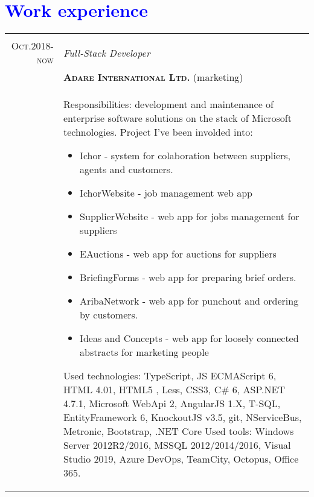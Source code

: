 \documentclass[a4paper,12pt]{article}
\begin{document}
\vspace{3em}
\section{\textcolor{Blue}{Work experience}}
\begin{tabular}{r|p{12cm}}
	\multicolumn{2}{c}{}\\
	\textsc{Oct.2018-now}
	&\emph{Full-Stack Developer} \\
	&\textsc{\textbf{Adare International Ltd.}} (marketing) \\
	&\footnotesize{
		Responsibilities: development and maintenance of enterprise software solutions on the stack of Microsoft technologies. \newline
		Project I've been involded into:
		\begin{itemize}
			\item Ichor - system for colaboration between suppliers, agents and customers.
			\item IchorWebsite - job management web app
			\item SupplierWebsite - web app for jobs management for suppliers
			\item EAuctions - web app for auctions for suppliers
			\item BriefingForms - web app for preparing brief orders.
			\item AribaNetwork - web app for punchout and ordering by customers.
			\item Ideas and Concepts - web app for loosely connected abstracts for marketing people
		\end{itemize}
		Used technologies: \newline
		TypeScript, JS ECMAScript 6, HTML 4.01, HTML5 , Less, CSS3, C\# 6, ASP.NET 4.7.1, Microsoft WebApi 2, AngularJS 1.X, T-SQL,
		EntityFramework 6, KnockoutJS v3.5, git, NServiceBus, Metronic, Bootstrap, .NET Core \newline
		Used tools: \newline
		Windows Server 2012R2/2016, MSSQL 2012/2014/2016, Visual Studio 2019, Azure DevOps, TeamCity, Octopus, Office 365.
	}\\
	
\end{tabular}
\end{document}
